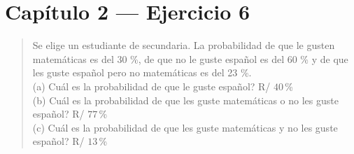 \documentclass[11pt]{article}
\begin{document}
\section*{Capítulo 2 --- Ejercicio 6}

\begin{quote}
Se elige un estudiante de secundaria. La probabilidad de que le gusten matemáticas es del 30 \%,
de que no le guste español es del 60 \% y de que les guste español pero no matemáticas es del
23 \%.\\
(a) Cuál es la probabilidad de que le guste español? \hfill R/ $40$\,\%\\
(b) Cuál es la probabilidad de que les guste matemáticas o no les guste español? \hfill R/ $77$\,\%\\
(c) Cuál es la probabilidad de que les guste matemáticas y no les guste español? \hfill R/ $13$\,\%
\end{quote}
\end{document}
